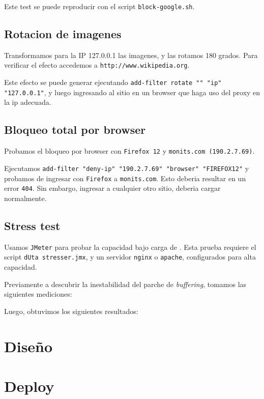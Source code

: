\documentclass[11pt,a4paper,titlepage]{article}
\begin{document}
    Este test se puede reproducir con el script \texttt{block-google.sh}.

    \subsection{Rotacion de imagenes}
    Transformamos para la IP 127.0.0.1 las imagenes, y las rotamos 180 grados.
    Para verificar el efecto accedemos a \texttt{http://www.wikipedia.org}.

    Este efecto se puede generar ejecutando \texttt{add-filter rotate "" "ip" "127.0.0.1"}, y luego ingresando al sitio en un browser que haga uso del proxy en la ip adecuada.

    \subsection{Bloqueo total por browser}
    Probamos el bloqueo por browser con \texttt{Firefox 12} y \texttt{monits.com (190.2.7.69)}.

    Ejecutamos \texttt{add-filter "deny-ip" "190.2.7.69" "browser" "FIREFOX12"} y probamos de ingresar con \texttt{Firefox} a \texttt{monits.com}.
    Esto deberia resultar en un error \texttt{404}.
    Sin embargo, ingresar a cualquier otro sitio, deberia cargar normalmente.

    \subsection{Stress test}
    Usamos \texttt{JMeter} para probar la capacidad bajo carga de \duta.
    Esta prueba requiere el script \texttt{dUta stresser.jmx}, y un servidor \texttt{nginx} o \texttt{apache}, configurados para alta capacidad.

    Previamente a descubrir la inestabilidad del parche de \textit{buffering}, tomamos las siguientes mediciones:


    Luego, obtuvimos los siguientes resultados:




\section{Diseño}

\section{Deploy}
\end{document}
